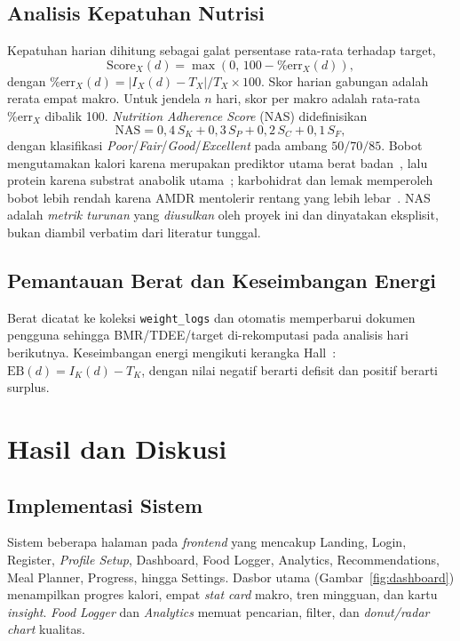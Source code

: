 \documentclass[conference]{IEEEtran}
\begin{document}
\subsection{Analisis Kepatuhan Nutrisi}
Kepatuhan harian dihitung sebagai galat persentase rata-rata terhadap target,
\begin{equation}
\text{Score}_{X}(d) = \max(0,\,100 - \%\text{err}_X(d)),
\end{equation}
dengan $\%\text{err}_X(d) = |I_X(d) - T_X|/T_X\times100$. Skor harian gabungan adalah rerata empat makro. Untuk jendela $n$ hari, skor per makro adalah rata-rata $\%\text{err}_X$ dibalik 100. \textit{Nutrition Adherence Score} (NAS) didefinisikan
\begin{equation}
\text{NAS} = 0{,}4\,S_K + 0{,}3\,S_P + 0{,}2\,S_C + 0{,}1\,S_F,
\end{equation}
dengan klasifikasi \textit{Poor}/\textit{Fair}/\textit{Good}/\textit{Excellent} pada ambang $50/70/85$. Bobot mengutamakan kalori karena merupakan prediktor utama berat badan~\cite{hall2011quantification}, lalu protein karena substrat anabolik utama~\cite{thomas2016position,rodriguez2009position}; karbohidrat dan lemak memperoleh bobot lebih rendah karena AMDR mentolerir rentang yang lebih lebar~\cite{iom2005}. NAS adalah \emph{metrik turunan} yang \emph{diusulkan} oleh proyek ini dan dinyatakan eksplisit, bukan diambil verbatim dari literatur tunggal.

\subsection{Pemantauan Berat dan Keseimbangan Energi}
Berat dicatat ke koleksi \texttt{weight\_logs} dan otomatis memperbarui dokumen pengguna sehingga BMR/TDEE/target di-rekomputasi pada analisis hari berikutnya. Keseimbangan energi mengikuti kerangka Hall~\cite{hall2011quantification}: $\text{EB}(d) = I_K(d) - T_K$, dengan nilai negatif berarti defisit dan positif berarti surplus.

\section{Hasil dan Diskusi}

\subsection{Implementasi Sistem}
Sistem beberapa halaman pada \textit{frontend} yang mencakup Landing, Login, Register, \textit{Profile Setup}, Dashboard, Food Logger, Analytics, Recommendations, Meal Planner, Progress, hingga Settings. Dasbor utama (Gambar~\ref{fig:dashboard}) menampilkan progres kalori, empat \textit{stat card} makro, tren mingguan, dan kartu \textit{insight}. \textit{Food Logger} dan \textit{Analytics} memuat pencarian, filter, dan \textit{donut/radar chart} kualitas.
\end{document}
